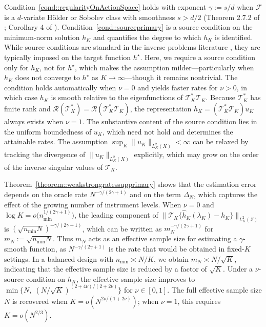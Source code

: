 \documentclass[11pt]{article}
\theoremstyle{plain}
\theoremstyle{definition}
\theoremstyle{remark}
\theoremstyle{definition}
\begin{document}
Condition~\ref{cond::regularityOnActionSpace} holds with exponent
\(\gamma := s/d\) when \(\mathcal{F}\) is a \(d\)-variate Hölder or Sobolev class
with smoothness \(s > d/2\) (Theorem 2.7.2 of \citealp{vanderVaartWellner};
Corollary 4 of \citealp{nickl2007bracketing}).  
Condition~\ref{cond::sourceprimary} is a source condition on the minimum-norm
solution \(h_K\) and quantifies the degree to which \(h_K\) is identified. While
source conditions are standard in the inverse problems literature
\citep{carrasco2007linear, bennett2023source}, they are typically imposed on the
target function \(h^\star\). Here, we require a source condition only for
\(h_K\), not for \(h^\star\), which makes the assumption milder---particularly
when \(h_K\) does not converge to \(h^\star\) as \(K \to \infty\)---though it
remains nontrivial. The condition holds automatically when \(\nu = 0\) and yields
faster rates for \(\nu > 0\), in which case \(h_K\) is smooth relative to the
eigenfunctions of \(\mathcal{T}_K^* \mathcal{T}_K\). Because \(\mathcal{T}_K^*\)
has finite rank and \(\mathcal{R}(\mathcal{T}_K^*) = \mathcal{R}(\mathcal{T}_K^*
\mathcal{T}_K)\), the representation \(h_K = (\mathcal{T}_K^* \mathcal{T}_K) u_K\)
always exists when \(\nu = 1\). The substantive content of the source condition
lies in the uniform boundedness of \(u_K\), which need not hold and determines
the attainable rates. The assumption \(\sup_K \|u_K\|_{L^2_K(X)} < \infty\) can
be relaxed by tracking the divergence of \(\|u_K\|_{L^2_K(X)}\) explicitly,
which may grow on the order of the inverse singular values of \(\mathcal{T}_K\).


Theorem~\ref{theorem::weakstrongratessupprimary} shows that the estimation error
depends on the oracle rate \(N^{-\gamma/(2\gamma+1)}\) and on the term
\(\Delta_N\), which captures the effect of the growing number of instrument
levels. When \(\nu = 0\) and 
\(\log K = o\!\bigl(n_{\min}^{1/(2\gamma+1)}\bigr)\), the leading component of
\(\|\mathcal{T}_K\{\widehat{h}_K(\lambda_K) - h_K\}\|_{L^2_K(Z)}\) is
\((\sqrt{n_{\min} N})^{-\gamma/(2\gamma+1)}\), which can be written as
\(m_N^{-\gamma/(2\gamma+1)}\) for \(m_N := \sqrt{n_{\min}N}\). Thus \(m_N\) acts as an effective sample size for estimating a
\(\gamma\)-smooth function, as \(N^{-\gamma/(2\gamma+1)}\) is the rate that
would be obtained in fixed-\(K\) settings.
In a balanced design with \(n_{\min} \asymp N/K\), we obtain
\(m_N \asymp N/\sqrt{K}\), indicating that the effective sample size is reduced
by a factor of \(\sqrt{K}\). Under a \(\nu\)-source condition on \(h_K\), the
effective sample size improves to 
\(\min\{N,\; (N/\sqrt{K})^{(2 + 4\nu)/(2 + 2\nu)}\}\) for \(\nu \in [0,1]\).
The full effective sample size \(N\) is recovered when 
\(K = o\!\left(N^{2\nu/(1 + 2\nu)}\right)\); when \(\nu = 1\), this requires
\(K = o(N^{2/3})\).
\end{document}
